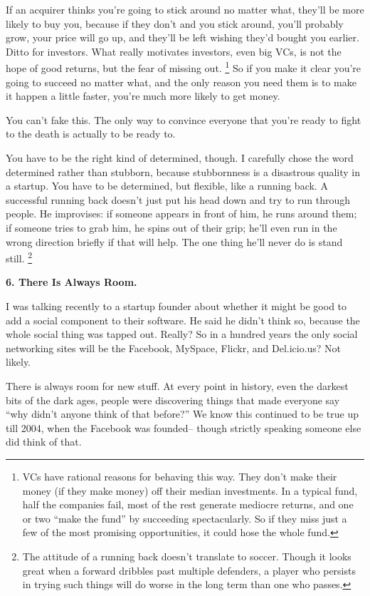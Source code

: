 \documentclass[12pt]{book}
\begin{document}
If an acquirer thinks you're going to stick around no matter what,
they'll be more likely to buy you, because if they don't and you stick
around, you'll probably grow, your price will go up, and they'll be left
wishing they'd bought you earlier. Ditto for investors. What really
motivates investors, even big VCs, is not the hope of good returns, but
the fear of missing out. \footnote{VCs have rational reasons for behaving this way. They don't make
their money (if they make money) off their median investments. In a
typical fund, half the companies fail, most of the rest generate
mediocre returns, and one or two ``make the fund'' by succeeding
spectacularly. So if they miss just a few of the most promising
opportunities, it could hose the whole fund.} So if you make it clear
you're going to succeed no matter what, and the only reason you need
them is to make it happen a little faster, you're much more likely to
get money.

You can't fake this. The only way to convince everyone that you're ready
to fight to the death is actually to be ready to.

You have to be the right kind of determined, though. I carefully chose
the word determined rather than stubborn, because stubbornness is a
disastrous quality in a startup. You have to be determined, but
flexible, like a running back. A successful running back doesn't just
put his head down and try to run through people. He improvises: if
someone appears in front of him, he runs around them; if someone tries
to grab him, he spins out of their grip; he'll even run in the wrong
direction briefly if that will help. The one thing he'll never do is
stand still. \footnote{The attitude of a running back doesn't translate to soccer.
Though it looks great when a forward dribbles past multiple defenders, a
player who persists in trying such things will do worse in the long term
than one who passes.}

\textbf{6. There Is Always Room.}

I was talking recently to a startup founder about whether it might be
good to add a social component to their software. He said he didn't
think so, because the whole social thing was tapped out. Really? So in a
hundred years the only social networking sites will be the Facebook,
MySpace, Flickr, and Del.icio.us? Not likely.

There is always room for new stuff. At every point in history, even the
darkest bits of the dark ages, people were discovering things that made
everyone say ``why didn't anyone think of that before?'' We know this
continued to be true up till 2004, when the Facebook was founded--
though strictly speaking someone else did think of that.
\end{document}
